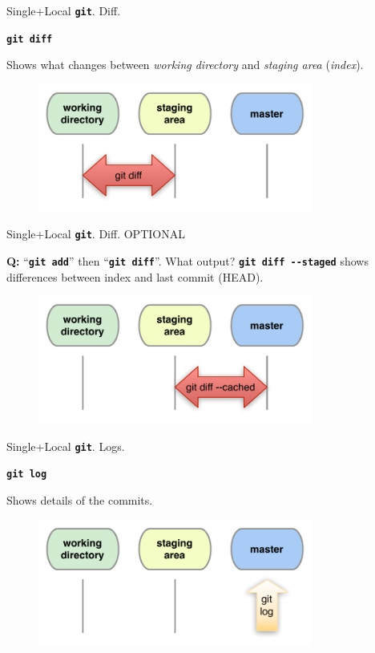 \documentclass{beamer}
\newcommand{\git}{\texttt{\textbf{git}}\xspace}
\begin{document}
\begin{frame}{Single+Local \git. Diff.}
  \begin{center}
    \texttt{\textbf{git diff}}
  \end{center}
  Shows what changes between \emph{working directory} and
  \emph{staging area} (\emph{index}).
  \begin{figure}
    \centering
    \includegraphics[width=9cm]{figs/local-diff}
  \end{figure}
\end{frame}

\begin{frame}{Single+Local \git. Diff. \alert{OPTIONAL}}
  \begin{block}{\textbf{Q:} ``\texttt{\textbf{git add}}'' then
      ``\texttt{\textbf{git diff}}''. What output?}
    \texttt{\textbf{git diff -{}-staged}} shows differences between
    index and last commit (\alert{HEAD}).
  \end{block}
  \begin{figure}
    \centering
    \includegraphics[width=9cm]{figs/local-diff-cached}
  \end{figure}
\end{frame}


\begin{frame}{Single+Local \git. Logs.}
  \begin{center}
    \texttt{\textbf{git log}}
  \end{center}
  Shows details of the commits.
  \begin{figure}
    \centering
    \includegraphics[width=9cm]{figs/local-log}
  \end{figure}
\end{frame}
\end{document}
